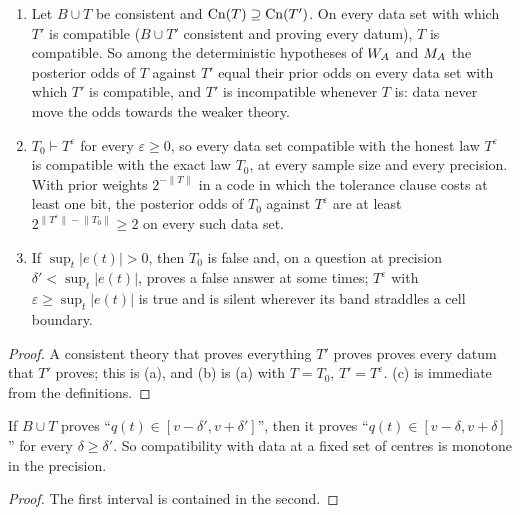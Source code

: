 \begin{proposition}\label{prop:laws:strength}
\leavevmode
\begin{enumerate}[label=(\alph*),itemsep=1pt,topsep=2pt]
\item Let $B\cup T$ be consistent and $\mathrm{Cn}(T)\supseteq\mathrm{Cn}(T')$. On every data set with which $T'$ is compatible ($B\cup T'$ consistent and proving every datum), $T$ is compatible. So among the deterministic hypotheses of $W_{A}$ and $M_{A}$ the posterior odds of $T$ against $T'$ equal their prior odds on every data set with which $T'$ is compatible, and $T'$ is incompatible whenever $T$ is: data never move the odds towards the weaker theory.
\item $T_0\vdash T^\varepsilon$ for every $\varepsilon\ge0$, so every data set compatible with the honest law $T^\varepsilon$ is compatible with the exact law $T_0$, at every sample size and every precision. With prior weights $2^{-\lVert T\rVert}$ in a code in which the tolerance clause costs at least one bit, the posterior odds of $T_0$ against $T^\varepsilon$ are at least $2^{\lVert T^\varepsilon\rVert-\lVert T_0\rVert}\ge2$ on every such data set.
\item If $\sup_t\lvert e(t)\rvert>0$, then $T_0$ is false and, on a question at precision $\delta'<\sup_t\lvert e(t)\rvert$, proves a false answer at some times; $T^\varepsilon$ with $\varepsilon\ge\sup_t\lvert e(t)\rvert$ is true and is silent wherever its band straddles a cell boundary.
\end{enumerate}
\end{proposition}

\begin{proof}
A consistent theory that proves everything $T'$ proves proves every datum that $T'$ proves; this is (a), and (b) is (a) with $T=T_0$, $T'=T^\varepsilon$. (c) is immediate from the definitions.
\end{proof}

\begin{proposition}\label{prop:laws:monotone}
If $B\cup T$ proves ``$q(t)\in[v-\delta',v+\delta']$'', then it proves ``$q(t)\in[v-\delta,v+\delta]$'' for every $\delta\ge\delta'$. So compatibility with data at a fixed set of centres is monotone in the precision.
\end{proposition}

\begin{proof}
The first interval is contained in the second.
\end{proof}

